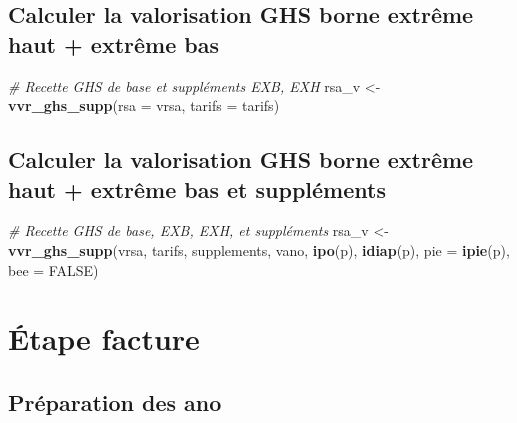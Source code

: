 \documentclass[]{book}
\newenvironment{Shaded}{\begin{snugshade}}{\end{snugshade}}
\newcommand{\KeywordTok}[1]{\textcolor[rgb]{0.13,0.29,0.53}{\textbf{#1}}}
\newcommand{\DataTypeTok}[1]{\textcolor[rgb]{0.13,0.29,0.53}{#1}}
\newcommand{\StringTok}[1]{\textcolor[rgb]{0.31,0.60,0.02}{#1}}
\newcommand{\CommentTok}[1]{\textcolor[rgb]{0.56,0.35,0.01}{\textit{#1}}}
\newcommand{\OtherTok}[1]{\textcolor[rgb]{0.56,0.35,0.01}{#1}}
\newcommand{\NormalTok}[1]{#1}
\begin{document}
\subsection{Calculer la valorisation GHS borne extrême haut + extrême
bas}\label{calculer-la-valorisation-ghs-borne-extreme-haut-extreme-bas}

\begin{Shaded}
\begin{Highlighting}[]
\CommentTok{# Recette GHS de base et suppléments EXB, EXH}
\NormalTok{rsa_v <-}\StringTok{ }\KeywordTok{vvr_ghs_supp}\NormalTok{(}\DataTypeTok{rsa =}\NormalTok{ vrsa, }\DataTypeTok{tarifs =}\NormalTok{ tarifs)}
\end{Highlighting}
\end{Shaded}

\subsection{Calculer la valorisation GHS borne extrême haut + extrême
bas et
suppléments}\label{calculer-la-valorisation-ghs-borne-extreme-haut-extreme-bas-et-supplements}

\begin{Shaded}
\begin{Highlighting}[]
\CommentTok{# Recette GHS de base, EXB, EXH, et suppléments}
\NormalTok{rsa_v <-}\StringTok{ }\KeywordTok{vvr_ghs_supp}\NormalTok{(vrsa, tarifs, supplements, vano, }\KeywordTok{ipo}\NormalTok{(p), }\KeywordTok{idiap}\NormalTok{(p), }\DataTypeTok{pie =} \KeywordTok{ipie}\NormalTok{(p), }\DataTypeTok{bee =} \OtherTok{FALSE}\NormalTok{)}
\end{Highlighting}
\end{Shaded}

\section{Étape facture}\label{etape-facture}

\subsection{Préparation des ano}\label{preparation-des-ano}
\end{document}
